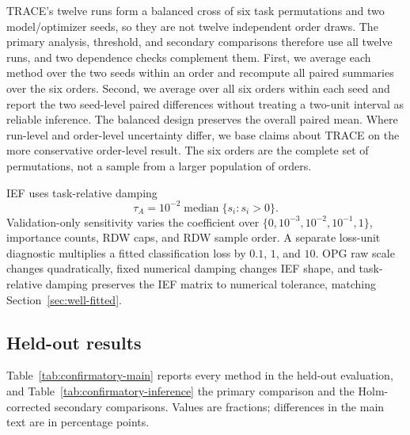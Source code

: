 TRACE's twelve runs form a balanced cross of six task permutations and two model/optimizer seeds, so they are not twelve independent order draws. The primary analysis, threshold, and secondary comparisons therefore use all twelve runs, and two dependence checks complement them. First, we average each method over the two seeds within an order and recompute all paired summaries over the six orders. Second, we average over all six orders within each seed and report the two seed-level paired differences without treating a two-unit interval as reliable inference. The balanced design preserves the overall paired mean. Where run-level and order-level uncertainty differ, we base claims about TRACE on the more conservative order-level result. The six orders are the complete set of permutations, not a sample from a larger population of orders.

IEF uses task-relative damping
\[
\tau_A=10^{-2}\operatorname{median}\{s_i:s_i>0\}.
\]
Validation-only sensitivity varies the coefficient over $\{0,10^{-3},10^{-2},10^{-1},1\}$, importance counts, RDW caps, and RDW sample order. A separate loss-unit diagnostic multiplies a fitted classification loss by $0.1$, $1$, and $10$. OPG raw scale changes quadratically, fixed numerical damping changes IEF shape, and task-relative damping preserves the IEF matrix to numerical tolerance, matching Section~\ref{sec:well-fitted}.

\subsection{Held-out results}
\label{app:confirmatory-results}

Table~\ref{tab:confirmatory-main} reports every method in the held-out evaluation, and Table~\ref{tab:confirmatory-inference} the primary comparison and the Holm-corrected secondary comparisons. Values are fractions; differences in the main text are in percentage points.


